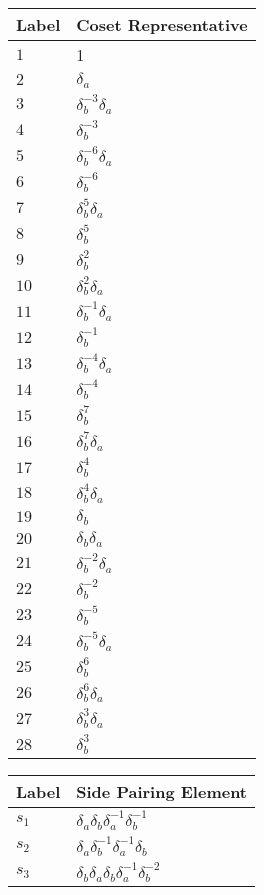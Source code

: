 \documentclass{article}
\begin{document}
\begin{center}
\begin{tabular}{ll}
\toprule
Label & Coset Representative\\
\midrule
$1$ & 1 \\
$2$ & $\delta_a^{}$ \\
$3$ & $\delta_b^{-3}\delta_a^{}$ \\
$4$ & $\delta_b^{-3}$ \\
$5$ & $\delta_b^{-6}\delta_a^{}$ \\
$6$ & $\delta_b^{-6}$ \\
$7$ & $\delta_b^{5}\delta_a^{}$ \\
$8$ & $\delta_b^{5}$ \\
$9$ & $\delta_b^{2}$ \\
$10$ & $\delta_b^{2}\delta_a^{}$ \\
$11$ & $\delta_b^{-1}\delta_a^{}$ \\
$12$ & $\delta_b^{-1}$ \\
$13$ & $\delta_b^{-4}\delta_a^{}$ \\
$14$ & $\delta_b^{-4}$ \\
$15$ & $\delta_b^{7}$ \\
$16$ & $\delta_b^{7}\delta_a^{}$ \\
$17$ & $\delta_b^{4}$ \\
$18$ & $\delta_b^{4}\delta_a^{}$ \\
$19$ & $\delta_b^{}$ \\
$20$ & $\delta_b^{}\delta_a^{}$ \\
$21$ & $\delta_b^{-2}\delta_a^{}$ \\
$22$ & $\delta_b^{-2}$ \\
$23$ & $\delta_b^{-5}$ \\
$24$ & $\delta_b^{-5}\delta_a^{}$ \\
$25$ & $\delta_b^{6}$ \\
$26$ & $\delta_b^{6}\delta_a^{}$ \\
$27$ & $\delta_b^{3}\delta_a^{}$ \\
$28$ & $\delta_b^{3}$ \\
\bottomrule
\end{tabular}
\hfill
\begin{tabular}{ll}
\toprule
Label & Side Pairing Element\\
\midrule
$s_{1}$ & $\delta_a^{}\delta_b^{}\delta_a^{-1}\delta_b^{-1}$ \\
$s_{2}$ & $\delta_a^{}\delta_b^{-1}\delta_a^{-1}\delta_b^{}$ \\
$s_{3}$ & $\delta_b^{}\delta_a^{}\delta_b^{}\delta_a^{-1}\delta_b^{-2}$ \\

\end{tabular}
\end{center}
\end{document}
